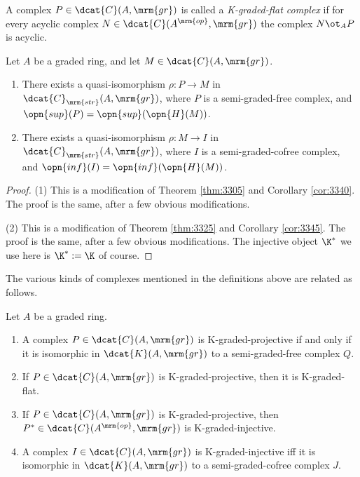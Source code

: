 \begin{dfn} \label{dfn:4277} 
A complex $P \in \dcat{C}(A, \mrm{gr})$ is called a 
{\em K-graded-flat complex}%
if for every acyclic complex 
$N \in \dcat{C}(A^{\mrm{op}}, \mrm{gr})$ the complex 
$N \ot_A P$ is acyclic. 
\end{dfn}

\begin{thm} \label{thm:3740}
Let $A$ be a graded ring, and let $M \in \dcat{C}(A, \mrm{gr})$.
\begin{enumerate}
\item There exists a quasi-isomorphism 
$\rho : P \to M$ in $\dcat{C}_{\mrm{str}}(A, \mrm{gr})$,
where $P$ is a semi-graded-free complex, 
and $\opn{sup}(P) = \opn{sup}(\opn{H}(M))$. 

\item  There exists a quasi-isomorphism 
$\rho : M \to I$ in $\dcat{C}_{\mrm{str}}(A, \mrm{gr})$,
where $I$ is a semi-graded-cofree complex, and
$\opn{inf}(I) = \opn{inf}(\opn{H}(M))$. 
\end{enumerate}
\end{thm}

\begin{proof} \mbox{}

\smallskip \noindent 
(1) This is a modification of Theorem \ref{thm:3305} and Corollary 
\ref{cor:3340}. The proof is the same, after a few obvious modifications. 

\medskip \noindent 
(2) This is a modification of Theorem \ref{thm:3325} and Corollary 
\ref{cor:3345}. The proof is the same, after a few obvious modifications. 
The injective object $\K^*$ we use here is $\K^* := \K$ of course. 
\end{proof}

The various kinds of complexes mentioned in the definitions above are related 
as follows. 

\begin{thm} \label{thm:4275}  
Let $A$ be a graded ring.
\begin{enumerate}
\item A complex $P \in \dcat{C}(A, \mrm{gr})$ is K-graded-projective if and 
only if it is 
isomorphic in $\dcat{K}(A, \mrm{gr})$ to a semi-graded-free complex $Q$.

\item If $P \in \dcat{C}(A, \mrm{gr})$ is K-graded-projective, then it is 
K-graded-flat. 

\item If $P \in \dcat{C}(A, \mrm{gr})$ is K-graded-projective, then 
$P^* \in \dcat{C}(A^{\mrm{op}}, \mrm{gr})$
is K-graded-injective. 

\item A complex $I \in \dcat{C}(A, \mrm{gr})$ is K-graded-injective iff it is 
isomorphic in $\dcat{K}(A, \mrm{gr})$ to a semi-graded-cofree complex $J$.
\end{enumerate}
\end{thm}

